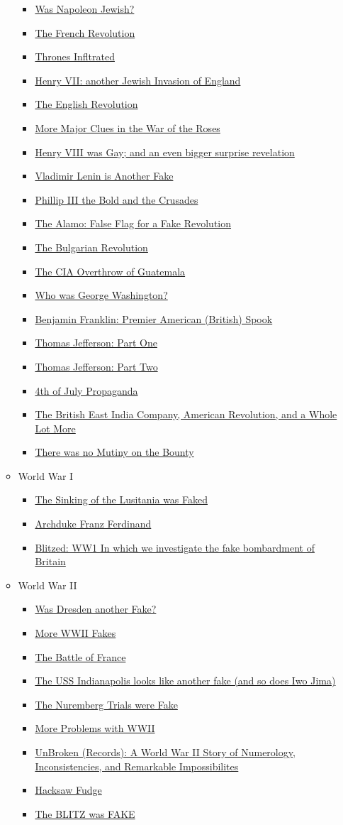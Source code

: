 \documentclass{article}
\newcommand{\insertmydocument}[2]{ %
  \item \href{http://www.mileswmathis.com/#2}{#1}
}
\begin{document}
\begin{itemize}
\begin{itemize}
\begin{itemize}
      \insertmydocument{Was Napoleon Jewish?}{napoleon.pdf}
      \insertmydocument{The French Revolution}{frev.pdf}
      \insertmydocument{Thrones Infltrated}{england.pdf}
      \insertmydocument{Henry VII: another Jewish Invasion of England}{henryvii.pdf}
      \insertmydocument{The English Revolution}{charlesI.pdf}
      \insertmydocument{More Major Clues in the War of the Roses}{boleyn.pdf}
      \insertmydocument{Henry VIII was Gay; and an even bigger surprise revelation}{henrygay.pdf}
      \insertmydocument{Vladimir Lenin is Another Fake}{lenin.pdf}
      \insertmydocument{Phillip III the Bold and the Crusades}{phillip.pdf}
      \insertmydocument{The Alamo: False Flag for a Fake Revolution}{alamo.pdf}
      \insertmydocument{The Bulgarian Revolution}{bulg.pdf}
      \insertmydocument{The CIA Overthrow of Guatemala}{guat.pdf}
      \insertmydocument{Who was George Washington?}{wash.pdf}
      \insertmydocument{Benjamin Franklin: Premier American (British) Spook}{ben.pdf}
      \insertmydocument{Thomas Jefferson: Part One}{jeffers.pdf}
      \insertmydocument{Thomas Jefferson: Part Two}{jeffers2.pdf}
      \insertmydocument{4th of July Propaganda}{rothbard.pdf}
      \insertmydocument{The British East India Company, American Revolution, and a Whole Lot More}{EIC.pdf}
      \insertmydocument{There was no Mutiny on the Bounty}{bounty.pdf}
    \end{itemize}

    \item World War I
    \begin{itemize}

      \insertmydocument{The Sinking of the Lusitania was Faked}{lusi.pdf}
      \insertmydocument{Archduke Franz Ferdinand}{archduke.pdf}
      \insertmydocument{Blitzed: WW1 In which we investigate the fake bombardment of Britain}{blitzed.pdf}
    \end{itemize}

    \item World War II
    \begin{itemize}

      \insertmydocument{Was Dresden another Fake?}{dresden.pdf}
      \insertmydocument{More WWII Fakes}{hitler2.pdf}
      \insertmydocument{The Battle of France}{meuse.pdf}
      \insertmydocument{The USS Indianapolis looks like another fake (and so does Iwo Jima)}{indian.pdf}
      \insertmydocument{The Nuremberg Trials were Fake}{nurem.pdf}
      \insertmydocument{More Problems with WWII}{deathrate.pdf}
      \insertmydocument{UnBroken (Records): A World War II Story of Numerology, Inconsistencies, and Remarkable Impossibilites}{unbroken.pdf}
      \insertmydocument{Hacksaw Fudge}{hacksaw.pdf}
      \insertmydocument{The BLITZ was FAKE}{pyle.pdf}
    \end{itemize}


\end{itemize}
\end{itemize}
\end{document}
